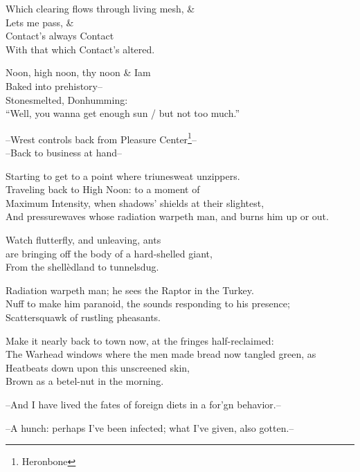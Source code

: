 Which clearing flows through living mesh, \& \\
Lets me pass, \& \\
Contact's always Contact \\
With that which Contact's altered.

\secdiv

Noon, high noon, thy noon \& Iam \\
Baked into prehistory-- \\
Stonesmelted, Donhumming: \\
``Well, you wanna get enough sun / but not too much.''

--Wrest controls back from Pleasure Center\footnote{Heronbone}-- \\
--Back to business at hand--

Starting to get to a point where triunesweat unzippers. \\
Traveling back to High Noon: to a moment of \\
Maximum Intensity, when shadows' shields at their slightest, \\
And pressurewaves whose radiation warpeth man, and burns him up or out. 

Watch flutterfly, and unleaving, ants \\
are bringing off the body of a hard-shelled giant, \\
From the shellèdland to tunnelsdug. 

Radiation warpeth man; he sees the Raptor in the Turkey. \\
Nuff to make him paranoid, the sounds responding to his presence; \\
Scattersquawk of rustling pheasants.

Make it nearly back to town now, at the fringes half-reclaimed: \\
The Warhead windows where the men made bread now tangled green, as \\
Heatbeats down upon this unscreened skin, \\
Brown as a betel-nut in the morning.

--And I have lived the fates of foreign diets in a for'gn behavior.--

--A hunch: perhaps I've been infected; what I've given, also gotten.--